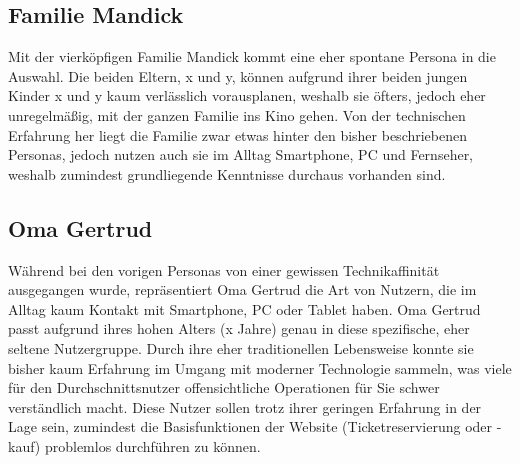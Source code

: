 \subsection{Familie Mandick}
Mit der vierköpfigen Familie Mandick kommt eine eher spontane Persona in die Auswahl. Die beiden Eltern, x und y, können aufgrund ihrer beiden jungen Kinder x und y kaum verlässlich vorausplanen, weshalb sie öfters, jedoch eher unregelmäßig, mit der ganzen Familie ins Kino gehen. Von der technischen Erfahrung her liegt die Familie zwar etwas hinter den bisher beschriebenen Personas, jedoch nutzen auch sie im Alltag Smartphone, PC und Fernseher, weshalb zumindest grundliegende Kenntnisse durchaus vorhanden sind.

\subsection{Oma Gertrud}
Während bei den vorigen Personas von einer gewissen Technikaffinität ausgegangen wurde, repräsentiert Oma Gertrud die Art von Nutzern, die im Alltag kaum Kontakt mit Smartphone, PC oder Tablet haben.
Oma Gertrud passt aufgrund ihres hohen Alters (x Jahre) genau in diese spezifische, eher seltene Nutzergruppe. Durch ihre eher traditionellen Lebensweise konnte sie bisher kaum Erfahrung im Umgang mit moderner Technologie
sammeln, was viele für den Durchschnittsnutzer offensichtliche Operationen für Sie schwer verständlich macht.
Diese Nutzer sollen trotz ihrer geringen Erfahrung in der Lage sein, zumindest die Basisfunktionen der Website (Ticketreservierung oder -kauf) problemlos durchführen zu können.